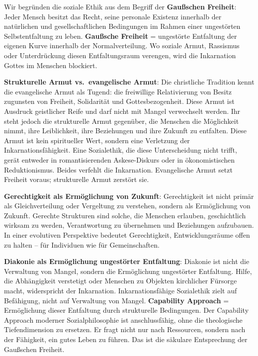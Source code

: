 \documentclass[
  ngerman,
]{article}
\begin{document}
Wir begründen die soziale Ethik aus dem Begriff der \textbf{Gaußschen
Freiheit}: Jeder Mensch besitzt das Recht, seine personale Existenz
innerhalb der natürlichen und gesellschaftlichen Bedingungen im Rahmen
einer ungestörten Selbstentfaltung zu leben. \textbf{Gaußsche Freiheit}
= ungestörte Entfaltung der eigenen Kurve innerhalb der
Normalverteilung. Wo soziale Armut, Rassismus oder Unterdrückung diesen
Entfaltungsraum verengen, wird die Inkarnation Gottes im Menschen
blockiert.

\textbf{Strukturelle Armut vs.~evangelische Armut}: Die christliche
Tradition kennt die evangelische Armut als Tugend: die freiwillige
Relativierung von Besitz zugunsten von Freiheit, Solidarität und
Gottesbezogenheit. Diese Armut ist Ausdruck geistlicher Reife und darf
nicht mit Mangel verwechselt werden. Ihr steht jedoch die strukturelle
Armut gegenüber, die Menschen die Möglichkeit nimmt, ihre Leiblichkeit,
ihre Beziehungen und ihre Zukunft zu entfalten. Diese Armut ist kein
spiritueller Wert, sondern eine Verletzung der Inkarnationsfähigkeit.
Eine Sozialethik, die diese Unterscheidung nicht trifft, gerät entweder
in romantisierenden Askese-Diskurs oder in ökonomistischen
Reduktionismus. Beides verfehlt die Inkarnation. Evangelische Armut
setzt Freiheit voraus; strukturelle Armut zerstört sie.

\textbf{Gerechtigkeit als Ermöglichung von Zukunft}: Gerechtigkeit ist
nicht primär als Gleichverteilung oder Vergeltung zu verstehen, sondern
als Ermöglichung von Zukunft. Gerechte Strukturen sind solche, die
Menschen erlauben, geschichtlich wirksam zu werden, Verantwortung zu
übernehmen und Beziehungen aufzubauen. In einer evolutiven Perspektive
bedeutet Gerechtigkeit, Entwicklungsräume offen zu halten -- für
Individuen wie für Gemeinschaften.

\textbf{Diakonie als Ermöglichung ungestörter Entfaltung}: Diakonie ist
nicht die Verwaltung von Mangel, sondern die Ermöglichung ungestörter
Entfaltung. Hilfe, die Abhängigkeit verstetigt oder Menschen zu Objekten
kirchlicher Fürsorge macht, widerspricht der Inkarnation.
Inkarnationsfähige Sozialethik zielt auf Befähigung, nicht auf
Verwaltung von Mangel. \textbf{Capability Approach} = Ermöglichung
dieser Entfaltung durch strukturelle Bedingungen. Der Capability
Approach moderner Sozialphilosophie ist anschlussfähig, ohne die
theologische Tiefendimension zu ersetzen. Er fragt nicht nur nach
Ressourcen, sondern nach der Fähigkeit, ein gutes Leben zu führen. Das
ist die säkulare Entsprechung der Gaußschen Freiheit.
\end{document}
